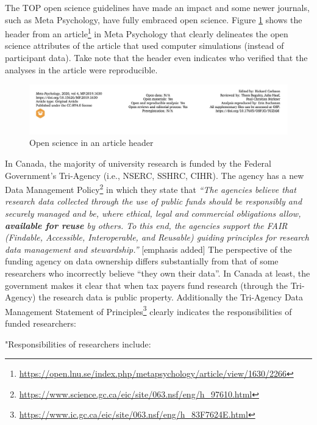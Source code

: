 \documentclass[
]{krantz}
\renewcommand{\href}[2]{#2\footnote{\url{#1}}}
\begin{document}
The TOP open science guidelines have made an impact and some newer journals, such as Meta Psychology, have fully embraced open science. Figure \ref{fig:metapsychology} shows the header from an \href{https://open.lnu.se/index.php/metapsychology/article/view/1630/2266}{article} in Meta Psychology that clearly delineates the open science attributes of the article that used computer simulations (instead of participant data). Take note that the header even indicates who verified that the analyses in the article were reproducible.

\begin{figure}
\includegraphics[width=1\linewidth]{ch_enter_load/images/screenshot_metapsychology} \caption{Open science in an article header}\label{fig:metapsychology}
\end{figure}

In Canada, the majority of university research is funded by the Federal Government's Tri-Agency (i.e., NSERC, SSHRC, CIHR). The agency has a new \href{https://www.science.gc.ca/eic/site/063.nsf/eng/h_97610.html}{Data Management Policy} in which they state that \emph{``The agencies believe that research data collected through the use of public funds should be responsibly and securely managed and be, where ethical, legal and commercial obligations allow, \textbf{available for reuse} by others. To this end, the agencies support the FAIR (Findable, Accessible, Interoperable, and Reusable) guiding principles for research data management and stewardship.''} {[}emphasis added{]} The perspective of the funding agency on data ownership differs substantially from that of some researchers who incorrectly believe ``they own their data''. In Canada at least, the government makes it clear that when tax payers fund research (through the Tri-Agency) the research data is public property. Additionally the \href{https://www.ic.gc.ca/eic/site/063.nsf/eng/h_83F7624E.html}{Tri-Agency Data Management Statement of Principles} clearly indicates the responsibilities of funded researchers:

"Responsibilities of researchers include:
\end{document}
